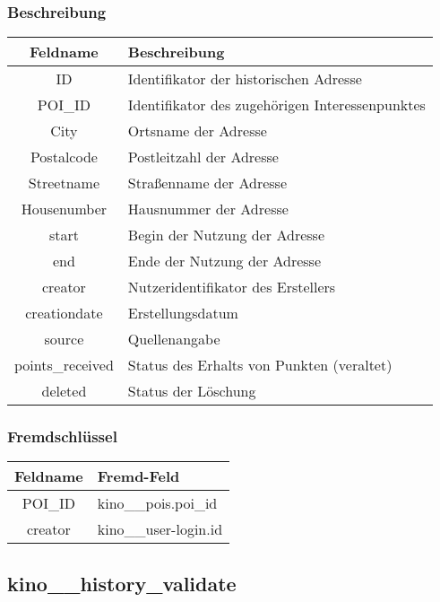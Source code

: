 \subsubsection{Beschreibung}
\begin{table}[H]
	\begin{tabular}{|c|p{12cm}|}
		\hline
		\textbf{Feldname} & \textbf{Beschreibung} \\ \hline
		ID & Identifikator der historischen Adresse \\ \hline
		POI\_ID & Identifikator des zugehörigen Interessenpunktes \\ \hline
		City & Ortsname der Adresse \\ \hline
		Postalcode & Postleitzahl der Adresse \\ \hline
		Streetname & Straßenname der Adresse \\ \hline
		Housenumber & Hausnummer der Adresse \\ \hline
		start & Begin der Nutzung der Adresse \\ \hline
		end & Ende der Nutzung der Adresse \\ \hline
		creator & Nutzeridentifikator des Erstellers \\ \hline
		creationdate & Erstellungsdatum \\ \hline
		source & Quellenangabe \\ \hline
		points\_received & Status des Erhalts von Punkten (veraltet) \\ \hline
		deleted & Status der Löschung \\ \hline
	\end{tabular}
\end{table}
\subsubsection{Fremdschlüssel}
\begin{table}[H]
	\begin{tabular}{|c|p{12.5cm}|}
		\hline
		\textbf{Feldname} & \textbf{Fremd-Feld} \\ \hline
		POI\_ID & kino\_\_pois.poi\_id \\ \hline
		creator & kino\_\_user-login.id \\ \hline
	\end{tabular}
\end{table}
\subsection{kino\_\_history\_validate}
